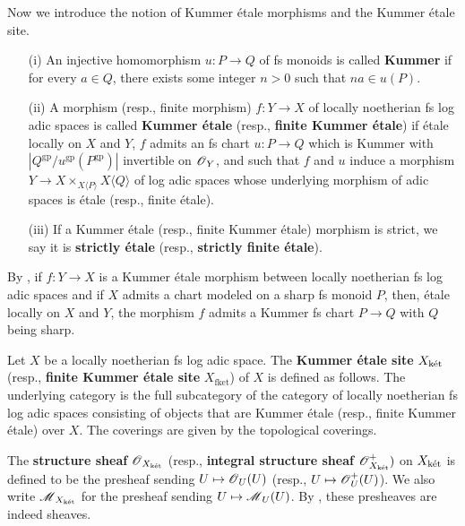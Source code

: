 Now we introduce the notion of Kummer \'etale morphisms and the Kummer \'etale site.

\begin{Definition}\label{Definition: Kummer etale morphism}
\begin{enumerate}
\item[(i)] An injective homomorphism $u:P\rightarrow Q$ of fs monoids is called \textbf{Kummer} if for every $a\in Q$, there exists some integer $n >0$ such that $na\in u(P)$.
\item[(ii)] A morphism (resp., finite morphism) $f: Y\rightarrow X$ of locally noetherian fs log adic spaces is called \textbf{Kummer \'etale} (resp., \textbf{finite Kummer \'etale}) if \'etale locally on $X$ and $Y$, $f$ admits an fs chart $u:P\rightarrow Q$ which is Kummer with $|Q^{\mathrm{gp}}/u^{\mathrm{gp}}(P^{\mathrm{gp}})|$ invertible on $\operatorname{\mathscr{O}}_Y$, and such that $f$ and $u$ induce a morphism $Y\rightarrow X\times_{X\langle P\rangle} X\langle Q\rangle$ of log adic spaces whose underlying morphism of adic spaces is \'etale (resp., finite \'etale).
\item[(iii)] If a Kummer \'etale (resp., finite Kummer \'etale) morphism is strict, we say it is \textbf{strictly \'etale} (resp., \textbf{strictly finite \'etale}).
\end{enumerate}
\end{Definition}

\begin{Remark}
\normalfont By \cite[Lemma 4.1.10]{Diao}, if $f:Y\rightarrow X$ is a Kummer \'etale morphism between locally noetherian fs log adic spaces and if $X$ admits a chart modeled on a sharp fs monoid $P$, then, \'etale locally on $X$ and $Y$, the morphism $f$ admits a Kummer fs chart $P\rightarrow Q$ with $Q$ being sharp.
\end{Remark}

\begin{Definition} 
Let $X$ be a locally noetherian fs log adic space. The \textbf{Kummer \'etale site} $X_{\operatorname{\textrm{k\'{e}t}}}$ (resp., \textbf{finite Kummer \'etale site} $X_{\textrm{fket}}$) of $X$ is defined as follows. The underlying category is the full subcategory of the category of locally noetherian fs log adic spaces consisting of objects that are Kummer \'etale (resp., finite Kummer \'etale) over $X$. The coverings are given by the topological coverings. 

The \textbf{structure sheaf} $\operatorname{\mathscr{O}}_{X_{\operatorname{\textrm{k\'{e}t}}}}$ (resp., \textbf{integral structure sheaf} $\operatorname{\mathscr{O}}_{X_{\operatorname{\textrm{k\'{e}t}}}}^{+})$ on $X_{\operatorname{\textrm{k\'{e}t}}}$ is defined to be the presheaf sending $U\mapsto \operatorname{\mathscr{O}}_U(U)$ (resp., $U\mapsto \operatorname{\mathscr{O}}_U^+(U)$). We also write $\operatorname{\mathscr{M}}_{X_{\operatorname{\textrm{k\'{e}t}}}}$ for the presheaf sending $U\mapsto \operatorname{\mathscr{M}}_U(U)$. By \cite[Theorem 4.3.1, Proposition 4.3.4]{Diao}, these presheaves are indeed sheaves. 
\end{Definition}

